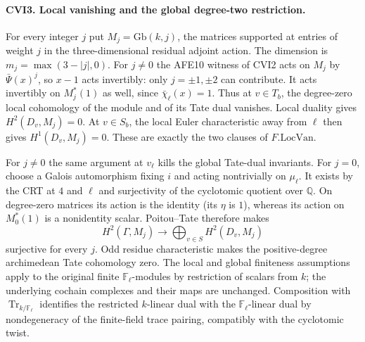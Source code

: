 \paragraph{CVI3. Local vanishing and the global degree-two restriction.}
\label{claim:CVI3}
For every integer $j$ put $M_j=\mathrm{Gb}(k,j)$, the matrices
supported at entries of weight $j$ in the three-dimensional
residual adjoint action. The dimension is
$m_j=\max(3-|j|,0)$. For $j\ne0$ the AFE10 witness of CVI2 acts
on $M_j$ by $\bar\Psi(x)^j$, so $x-1$ acts invertibly:
only $j=\pm1,\pm2$ can contribute. It acts invertibly on
$M_j^*(1)$ as well, since $\bar\chi_\ell(x)=1$.
Thus at $v\in T_b$, the degree-zero local cohomology of the
module and of its Tate dual vanishes. Local duality gives
$H^2(D_v,M_j)=0$. At $v\in S_b$, the local Euler characteristic
away from $\ell$ then gives $H^1(D_v,M_j)=0$. These are exactly
the two clauses of $F.\mathrm{LocVan}$.

For $j\ne0$ the same argument at $v_\ell$ kills the global
Tate-dual invariants. For $j=0$, choose a Galois automorphism
fixing $i$ and acting nontrivially on $\mu_\ell$. It exists by
the CRT at $4$ and $\ell$ and surjectivity of the cyclotomic
quotient over $\mathbb Q$. On degree-zero matrices its action
is the identity (its $\eta$ is $1$), whereas its action on
$M_0^*(1)$ is a nonidentity scalar. Poitou--Tate therefore makes
\[
             H^2(\Gamma,M_j)\longrightarrow
                     \bigoplus_{v\in S} H^2(D_v,M_j)
\]
surjective for every $j$. Odd residue characteristic makes the
positive-degree archimedean Tate cohomology zero. The local and
global finiteness assumptions apply to the original finite
$\mathbb F_\ell$-modules by restriction of scalars from $k$;
the underlying cochain complexes and their maps are unchanged.
Composition with $\operatorname{Tr}_{k/\mathbb F_\ell}$ identifies the
restricted $k$-linear dual with the $\mathbb F_\ell$-linear dual by
nondegeneracy of the finite-field trace pairing, compatibly with
the cyclotomic twist.

